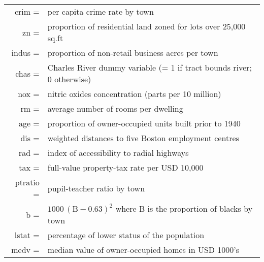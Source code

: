 \documentclass[11pt]{report}
\begin{document}
\begin{tabular}{rl}
crim =&per capita crime rate by town\\
zn =&proportion of residential land zoned for lots over 25,000 sq.ft\\
indus =&proportion of non-retail business acres per town\\
chas = &Charles River dummy variable (= 1 if tract bounds river; 0 otherwise)\\
nox = &nitric oxides concentration (parts per 10 million)\\
rm =&average number of rooms per dwelling\\
age =&proportion of owner-occupied units built prior to 1940\\
dis =&weighted distances to five Boston employment centres\\
rad =&index of accessibility to radial highways\\
tax =&full-value property-tax rate per USD 10,000\\
ptratio =&pupil-teacher ratio by town\\
b =&$1000\,(\text{B} - 0.63)^2$ where B is the proportion of blacks by town\\
lstat = &percentage of lower status of the population\\
medv =&median value of owner-occupied homes in USD 1000's \\\end{tabular}
\end{document}
